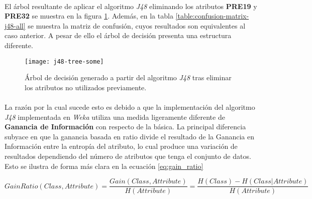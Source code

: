 \documentclass[10pt, a4paper,spanish]{article}
\begin{document}
		\paragraph{}
		El árbol resultante de aplicar el algoritmo \emph{J48} eliminando los atributos \textbf{PRE19} y \textbf{PRE32} se muestra en la figura \ref{fig:j48-tree-some}. Además, en la tabla \ref{table:confusion-matrix-j48-all} se muestra la matriz de confusión, cuyos resultados son equivalentes al caso anterior. A pesar de ello el árbol de decisión presenta una estructura diferente.


		\begin{figure}[h]
			\begin{center}
				\texttt{[image: j48-tree-some]}
			\end{center}
			\caption{Árbol de decisión generado a partir del algoritmo \emph{J48} tras eliminar los atributos no utilizados previamente.}
			\label{fig:j48-tree-some}
		\end{figure}

		\paragraph{}
		La razón por la cual sucede esto es debido a que la implementación del algoritmo \emph{J48} implementada en \emph{Weka}\cite{tool:weka} utiliza una medida ligeramente diferente de \textbf{Ganancia de Información} con respecto de la básica. La principal diferencia subyace en que la ganancia basada en ratio divide el resultado de la Ganancia en Información entre la entropía del atributo, lo cual produce una variación de resultados dependiendo del número de atributos que tenga el conjunto de datos. Esto se ilustra de forma más clara en la ecuación \eqref{eq:gain_ratio}

		\begin{equation}
		\label{eq:gain_ratio}
		GainRatio(Class, Attribute) = \frac{Gain(Class, Attribute)}{H(Attribute)} = \frac{H(Class) - H(Class | Attribute)}{H(Attribute)}
		\end{equation}
\end{document}
